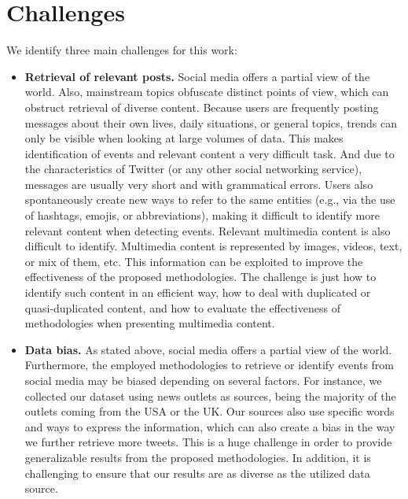 


\section*{Challenges} 

We identify three main challenges for this work:

\begin{itemize}
    \item {\bf Retrieval of relevant posts.} 
    Social media offers a partial view of the world. 
    Also, mainstream topics obfuscate distinct points of view, which can
    obstruct retrieval of diverse content. 
    Because users are frequently posting messages about their own lives, daily
    situations, or general topics, trends can only be visible when looking at large
    volumes of data. 
    This makes identification of events and relevant content a very difficult task.
    And due to the characteristics of Twitter (or any other social networking
    service), messages are usually very short and with grammatical errors. 
    Users also spontaneously create new ways to refer to the same entities
    (e.g., via the use of hashtags, emojis, or abbreviations), making it
    difficult to identify more relevant content when detecting events.
    Relevant multimedia content is also difficult to identify. 
    Multimedia content is represented by images, videos, text, or mix of them,
    etc. 
    This information can be exploited to improve the effectiveness of
    the proposed methodologies. 
    The challenge is just how to identify such content in an efficient way, how
    to deal with duplicated or quasi-duplicated content, and how to evaluate the
    effectiveness of methodologies when presenting multimedia content. 

    \item {\bf Data bias.}
    As stated above, social media offers a partial view of the world. 
    Furthermore, the employed methodologies to retrieve or identify events from
    social media may be biased depending on several factors. 
    For instance, we collected our dataset using news outlets as sources, being
    the majority of the outlets coming from the USA or the UK. 
    Our sources also use specific words and ways to express the information,
    which can also create a bias in the way we further retrieve more tweets.
    This is a huge challenge in order to provide generalizable results from the
    proposed methodologies. 
    In addition, it is challenging to ensure that our results are as diverse as the
    utilized data source. 


\end{itemize}
